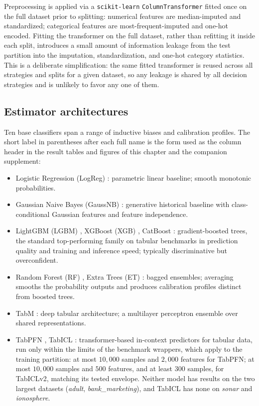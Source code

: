 

Preprocessing is applied via a \texttt{scikit-learn} \citep{pedregosa2011scikit} \texttt{ColumnTransformer} fitted once on the full dataset prior to splitting: numerical features are median-imputed and standardized; categorical features are most-frequent-imputed and one-hot encoded. Fitting the transformer on the full dataset, rather than refitting it inside each split, introduces a small amount of information leakage from the test partition into the imputation, standardization, and one-hot category statistics. This is a deliberate simplification: the same fitted transformer is reused across all strategies and splits for a given dataset, so any leakage is shared by all decision strategies and is unlikely to favor any one of them.

\subsection{Estimator architectures}
Ten base classifiers span a range of inductive biases and calibration profiles. The short label in parentheses after each full name is the form used as the column header in the result tables and figures of this chapter and the companion supplement:
\begin{itemize}
    \item Logistic Regression (LogReg) \citep[Sec.~4.4]{hastie2009elements}: parametric linear baseline; smooth monotonic probabilities.
    \item Gaussian Naive Bayes (GaussNB) \citep[Sec.~6.6.3]{hastie2009elements}: generative historical baseline with class-conditional Gaussian features and feature independence.
    \item LightGBM (LGBM) \citep{ke2017lightgbm}, XGBoost (XGB) \citep{chen2016xgboost}, CatBoost \citep{prokhorenkova2018catboost}: gradient-boosted trees, the standard top-performing family on tabular benchmarks in prediction quality and training and inference speed; typically discriminative but overconfident.
    \item Random Forest (RF) \citep{breiman2001random}, Extra Trees (ET) \citep{geurts2006extratrees}: bagged ensembles; averaging smooths the probability outputs and produces calibration profiles distinct from boosted trees.
    \item TabM \citep{gorishniy2025tabm}: deep tabular architecture; a multilayer perceptron ensemble over shared representations.
    \item TabPFN \citep{hollmann2025accurate}, TabICL \citep{qu2025tabicl}: transformer-based in-context predictors for tabular data, run only within the limits of the benchmark wrappers, which apply to the training partition: at most $10{,}000$ samples and $2{,}000$ features for TabPFN\@; at most $10{,}000$ samples and $500$ features, and at least $300$ samples, for TabICLv2, matching its tested envelope. Neither model has results on the two largest datasets (\textit{adult}, \textit{bank\_marketing}), and TabICL has none on \textit{sonar} and \textit{ionosphere}.
\end{itemize}
